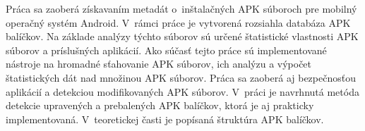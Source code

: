 Práca sa zaoberá získavaním metadát o~inštalačných APK súboroch pre mobilný operačný systém Android. V~rámci práce je vytvorená rozsiahla databáza APK balíčkov. Na základe analýzy týchto súborov sú určené štatistické vlastnosti APK súborov a príslušných aplikácií. Ako súčasť tejto práce sú implementované nástroje na hromadné sťahovanie APK súborov, ich analýzu a výpočet štatistických dát nad množinou APK súborov. Práca sa zaoberá aj bezpečnosťou aplikácií a detekciou modifikovaných APK súborov. V~práci je navrhnutá metóda detekcie upravených a prebalených APK balíčkov, ktorá je aj prakticky implementovaná. V~teoretickej časti je popísaná štruktúra APK balíčkov.